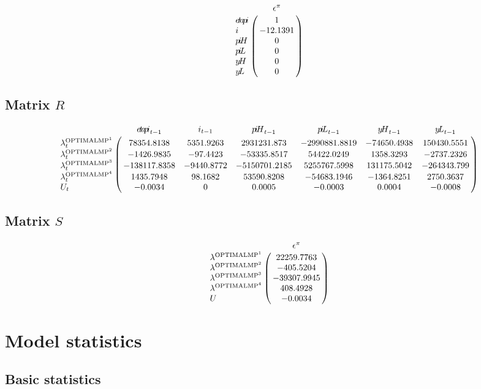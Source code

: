 $$\bordermatrix{
~ & \epsilon^{\pi} \cr
{e\!t\!a\!p\!i} & 1 \cr
i & -12.1391 \cr
{p\!i\!H} & 0 \cr
{p\!i\!L} & 0 \cr
{y\!H} & 0 \cr
{y\!L} & 0 \cr
}$$

\subsection*{Matrix $R$}

$$\bordermatrix{
~ & {e\!t\!a\!p\!i}_{t-1} & i_{t-1} & {p\!i\!H}_{t-1} & {p\!i\!L}_{t-1} & {y\!H}_{t-1} & {y\!L}_{t-1} \cr
\lambda^{\mathrm{OPTIMALMP}^{\mathrm{1}}}_{t} & 78354.8138 & 5351.9263 & 2931231.873 & -2990881.8819 & -74650.4938 & 150430.5551 \cr
\lambda^{\mathrm{OPTIMALMP}^{\mathrm{2}}}_{t} & -1426.9835 & -97.4423 & -53335.8517 & 54422.0249 & 1358.3293 & -2737.2326 \cr
\lambda^{\mathrm{OPTIMALMP}^{\mathrm{3}}}_{t} & -138117.8358 & -9440.8772 & -5150701.2185 & 5255767.5998 & 131175.5042 & -264343.799 \cr
\lambda^{\mathrm{OPTIMALMP}^{\mathrm{4}}}_{t} & 1435.7948 & 98.1682 & 53590.8208 & -54683.1946 & -1364.8251 & 2750.3637 \cr
U_{t} & -0.0034 & 0 & 0.0005 & -0.0003 & 0.0004 & -0.0008 \cr
}$$

\subsection*{Matrix $S$}

$$\bordermatrix{
~ & \epsilon^{\pi} \cr
\lambda^{\mathrm{OPTIMALMP}^{\mathrm{1}}} & 22259.7763 \cr
\lambda^{\mathrm{OPTIMALMP}^{\mathrm{2}}} & -405.5204 \cr
\lambda^{\mathrm{OPTIMALMP}^{\mathrm{3}}} & -39307.9945 \cr
\lambda^{\mathrm{OPTIMALMP}^{\mathrm{4}}} & 408.4928 \cr
U & -0.0034 \cr
}$$


\section{Model statistics}

\subsection{Basic statistics}

